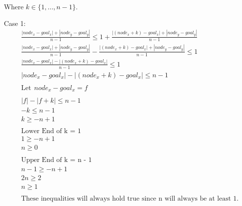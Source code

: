 \documentclass[a4paper]{article}
\begin{document}
\begin{sloppypar}
\begin{enumerate}[start=6,label=Q\arabic*,left=0pt]
    Where $ k \in \{1, \ldots, n-1\} $.

    Case 1:
    \begin{align*}
        &\frac{|node_x - goal_x| + |node_y - goal_y|}{n - 1} \leq 1 + \frac{|(node_x + k) - goal_x| + |node_y - goal_y|}{n - 1} \\
        &\frac{|node_x - goal_x| + |node_y - goal_y|}{n - 1} - \frac{|(node_x + k) - goal_x| + |node_y - goal_y|}{n - 1} \leq 1 \\
        &\frac{|node_x - goal_x| - |(node_x + k) - goal_x|}{n - 1} \leq 1 \\
        &|node_x - goal_x| - |(node_x + k) - goal_x| \leq n - 1 \\\\
        &\text{Let} \:\: node_x - goal_x = f \\\\
        &|f| - |f + k| \leq n - 1 \\
        &-k \leq n - 1 \\
        &k \geq -n + 1 \\\\
        &\text{Lower End of k = 1} \\
        &1 \geq -n + 1 \\
        &n \geq 0 \\\\
        &\text{Upper End of k = n - 1} \\
        &n - 1 \geq -n + 1 \\
        &2n \geq 2 \\
        &n \geq 1 \\\\
        &\text{These inequalities will always hold true since n will always be at least 1.}
    \end{align*}


\end{enumerate}
\end{sloppypar}
\end{document}
